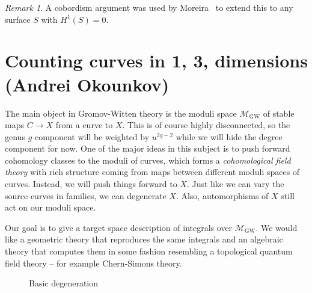 \documentclass[leqno, openany]{memoir}
\theoremstyle{definition}
\theoremstyle{remark}
\newtheorem{rmk}[thm]{Remark}
\theoremstyle{plain}
\theoremstyle{definition}
\theoremstyle{remark}
\newcommand{\mc}[1]{\mathcal{#1}}
\newcommand{\mr}[1]{\mathrm{#1}}
\begin{document}
\begin{rmk}
A cobordism argument was used by Moreira~\cite{moreira} to extend this to any surface $S$ with $H^1(S) = 0$.
\end{rmk}


\chapter{Counting curves in 1, 3,  dimensions (Andrei Okounkov)}%
\label{cha:andrei}

The main object in Gromov-Witten theory is the moduli space $\mc{M}_{\mr{GW}}$ of stable maps $C \to X$ from a curve to $X$. This is of course highly disconnected, so the genus $g$ component will be weighted by $u^{2g-2}$ while we will hide the degree component for now. One of the major ideas in this subject is to push forward cohomology classes to the moduli of curves, which forms a \textit{cohomological field theory} with rich structure coming from maps between different moduli spaces of curves. Instead, we will push things forward to $X$. Just like we can vary the source curves in families, we can degenerate $X$. Also, automorphisms of $X$ still act on our moduli space.

Our goal is to give a target space description of integrals over $\mc{M}_{\mr{GW}}$. We would like a geometric theory that reproduces the same integrals and an algebraic theory that computes them in some fashion resembling a topological quantum field theory -- for example Chern-Simons theory.

\begin{figure}[h]
    \centering
    \caption{Basic degeneration}
    \label{fig:basicdeg}
\end{figure}
\end{document}
